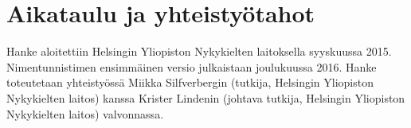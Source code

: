 \documentclass[12pt,a4paper,finnish,oneside]{article}
\begin{document}
\section{Aikataulu ja yhteistyötahot}

Hanke aloitettiin Helsingin Yliopiston Nykykielten laitoksella syyskuussa 2015. Nimentunnistimen ensimmäinen versio julkaistaan joulukuussa 2016. Hanke toteutetaan yhteistyössä Miikka Silfverbergin (tutkija, Helsingin Yliopiston Nykykielten laitos) kanssa Krister Lindenin (johtava tutkija, Helsingin Yliopiston Nykykielten laitos) valvonnassa.








\end{document}
